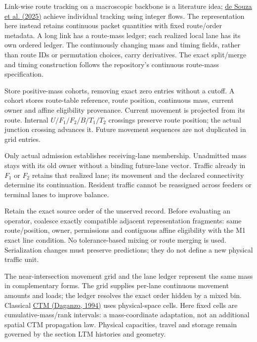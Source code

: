 \documentclass[10pt,a4paper]{article}
\begin{document}
Link-wise route tracking on a macroscopic backbone is a literature idea;
\href{https://doi.org/10.1016/j.simpat.2025.103088}{de Souza et al. (2025)}
achieve individual tracking using integer flows. The representation here
instead retains continuous packet quantities with fixed route/order
metadata. A long link has a route-mass ledger; each realized local lane
has its own ordered ledger. The continuously changing mass and timing
fields, rather than route IDs or permutation choices, carry derivatives.
The exact split/merge and timing construction follows the repository's
continuous route-mass specification.
\par

Store positive-mass cohorts, removing exact zero entries without a cutoff.
A cohort stores route-table reference, route position, continuous mass,
current owner and affine eligibility provenance. Current movement is
projected from its route. Internal $U/F_1/F_2/B/T_1/T_2$ crossings preserve route
position; the actual junction crossing advances it. Future movement
sequences are not duplicated in grid entries.

Only actual admission establishes receiving-lane membership. Unadmitted
mass stays with its old owner without a binding future-lane vector.
Traffic already in $F_1$ or $F_2$ retains that realized lane; its movement
and the declared connectivity determine its continuation. Resident traffic
cannot be reassigned across feeders or terminal lanes to improve balance.

Retain the exact source order of the unserved record. Before evaluating
an operator, coalesce exactly compatible adjacent representation fragments:
same route/position, owner, permissions and contiguous affine eligibility
with the M1 exact line condition. No tolerance-based mixing or route
merging is used. Serialization changes must preserve predictions; they
do not define a new physical traffic unit.


The near-intersection movement grid and the lane ledger represent the
same mass in complementary forms. The grid supplies per-lane continuous
movement amounts and loads; the ledger resolves the exact order hidden
by a mixed bin. Classical
\href{https://doi.org/10.1016/0191-2615(94)90002-7}{CTM (Daganzo, 1994)}
uses physical-space cells. Here fixed cells are cumulative-mass/rank
intervals: a mass-coordinate adaptation, not an additional spatial CTM
propagation law. Physical capacities, travel and storage remain governed
by the section LTM histories and geometry.
\end{document}
